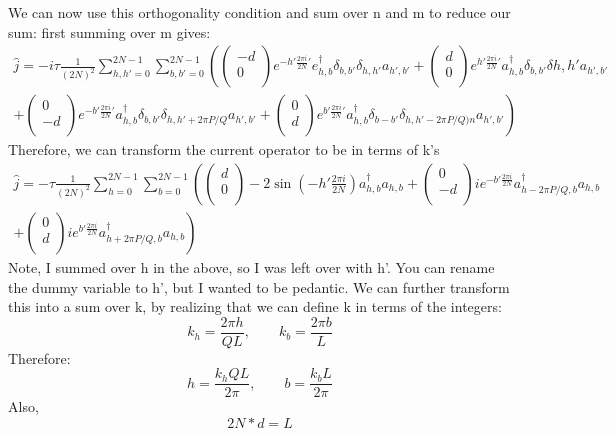 \documentclass[12pt]{article}
\begin{document}
We can now use this orthogonality condition and sum over n and m to reduce our sum: first
summing over m gives:
\begin{multline}
\hat{j} = -i\tau  
\frac{1}{(2N)^2} \sum^{2N-1}_{h,h'=0} \sum^{2N-1}_{b,b'=0} \left( \begin{pmatrix}
			-d \\
		0\\
		\end{pmatrix} e^{-h'\frac{2 \pi i}{2N}'} e^\dagger_{h,b} \delta_{b,b'} \delta_{h,h'} a_{h',b'}+\begin{pmatrix}
			d \\
		0\\
		\end{pmatrix} 
e^{h'\frac{2 \pi i}{2N}'} a^\dagger_{h,b} \delta_{b,b'} \delta{h,h'} a_{h',b'}  \right. \\
\left.+\begin{pmatrix}
			0 \\
		-d\\
		\end{pmatrix} e^{-b'\frac{2 \pi i}{2N}'} a^\dagger_{h,b} \delta_{b,b'}  \delta_{h,h'+2 \pi P/Q} a_{h',b'}+ \begin{pmatrix}
			0 \\
		d\\
		\end{pmatrix} e^{b'\frac{2 \pi i}{2N}'} a^\dagger_{h,b} \delta_{b-b'} \delta_{h,h'-2\pi P/Q)n} a_{h',b'} \right) 
\end{multline}
Therefore, we can transform the current operator to be in terms of k's
\begin{multline}
\hat{j} =  -\tau 
\frac{1}{(2N)^2} \sum^{2N-1}_{h=0} \sum^{2N-1}_{b=0} \left( \begin{pmatrix}
			d \\
		0\\
		\end{pmatrix} -2 \sin(-h'\frac{2 \pi i}{2N}) a^\dagger_{h,b}  a_{h,b}+\begin{pmatrix}
			0 \\
		-d\\
		\end{pmatrix} ie^{-b'\frac{2 \pi i}{2N}} a^\dagger_{h-2 \pi P/Q,b}  a_{h,b}\right.\\
		\left.+ \begin{pmatrix}
			0 \\
		d\\
		\end{pmatrix} ie^{b'\frac{2 \pi i}{2N}} a^\dagger_{h+2\pi P/Q,b}  a_{h,b} \right) 
\end{multline}
Note, I summed over h in the above, so I was left over with h'. You can rename the dummy variable to h', but I wanted to be pedantic.
We can further transform this into a sum over k, by realizing that we
can define k in terms of the integers:
\[
k_h = \frac{2 \pi h}{QL}, \qquad k_b = \frac{2 \pi b}{L}
\]
Therefore:
\[
h = \frac{k_h QL}{2 \pi}, \qquad b = \frac{k_b L}{2 \pi}
\]
Also,
\[
2N*d = L
\]
\end{document}
